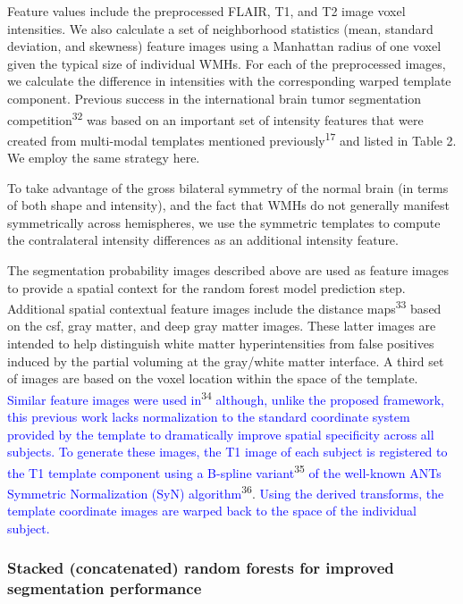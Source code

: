 \documentclass[11pt,]{article}
\begin{document}
Feature values include the preprocessed FLAIR, T1, and T2 image voxel
intensities. We also calculate a set of neighborhood statistics (mean,
standard deviation, and skewness) feature images using a Manhattan
radius of one voxel given the typical size of individual WMHs. For each
of the preprocessed images, we calculate the difference in intensities
with the corresponding warped template component. Previous success in
the international brain tumor segmentation
competition\textsuperscript{32} was based on an important set of
intensity features that were created from multi-modal templates
mentioned previously\textsuperscript{17} and listed in Table 2. We
employ the same strategy here.

To take advantage of the gross bilateral symmetry of the normal brain
(in terms of both shape and intensity), and the fact that WMHs do not
generally manifest symmetrically across hemispheres, we use the
symmetric templates to compute the contralateral intensity differences
as an additional intensity feature.

The segmentation probability images described above are used as feature
images to provide a spatial context for the random forest model
prediction step. Additional spatial contextual feature images include
the distance maps\textsuperscript{33} based on the csf, gray matter, and
deep gray matter images. These latter images are intended to help
distinguish white matter hyperintensities from false positives induced
by the partial voluming at the gray/white matter interface. A third set
of images are based on the voxel location within the space of the
template.
\textcolor{blue}{Similar feature images were used in}\textsuperscript{34}
\textcolor{blue}{although, unlike the proposed framework, this previous work lacks
normalization to the standard
coordinate system provided by the template to dramatically improve spatial specificity
across all subjects.  To generate these images, the T1 image of each subject is
registered to the T1 template component using a B-spline variant}\textsuperscript{35}
\textcolor{blue}{of the well-known ANTs Symmetric Normalization (SyN) algorithm}\textsuperscript{36}.
\textcolor{blue}{Using the derived transforms, the template coordinate images are warped back to the space of the individual subject.}

\subsubsection{Stacked (concatenated) random forests for improved
segmentation
performance}\label{stacked-concatenated-random-forests-for-improved-segmentation-performance}
\end{document}
